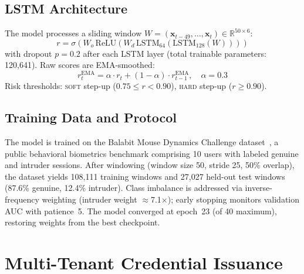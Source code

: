 \documentclass[journal,twoside,10pt]{IEEEtran}
\begin{document}
\subsection{LSTM Architecture}
The model processes a sliding window
$W = (\mathbf{x}_{t-49}, \ldots, \mathbf{x}_t) \in \mathbb{R}^{50 \times 6}$:
\begin{equation}
  r = \sigma\!\left(W_o\,\mathrm{ReLU}\!\left(W_d\,
      \mathrm{LSTM}_{64}\!\left(\mathrm{LSTM}_{128}(W)\right)\right)\right)
  \label{eq:lstm}
\end{equation}
\noindent with dropout $p = 0.2$ after each LSTM layer (total trainable
parameters: 120,641). Raw scores are EMA-smoothed:
\begin{equation}
  r_t^{\text{EMA}} = \alpha \cdot r_t + (1-\alpha) \cdot r_{t-1}^{\text{EMA}},
  \quad \alpha = 0.3
  \label{eq:ema}
\end{equation}
Risk thresholds: \textsc{soft} step-up ($0.75 \leq r < 0.90$), \textsc{hard}
step-up ($r \geq 0.90$).

\subsection{Training Data and Protocol}
The model is trained on the Balabit Mouse Dynamics Challenge
dataset~\cite{balabit}, a public behavioral biometrics benchmark comprising
10 users with labeled genuine and intruder sessions. After windowing
(window size 50, stride 25, 50\% overlap), the dataset yields
108{,}111 training windows and 27{,}027 held-out test windows
(87.6\% genuine, 12.4\% intruder). Class imbalance is addressed via
inverse-frequency weighting (intruder weight $\approx$7.1$\times$);
early stopping monitors validation AUC with patience~5. The model
converged at epoch~23 (of 40 maximum), restoring weights from the best
checkpoint.

\section{Multi-Tenant Credential Issuance}
\label{sec:issuer}
\end{document}
